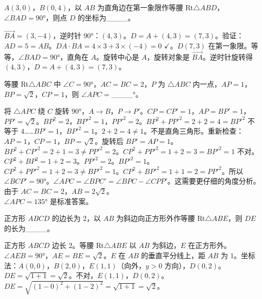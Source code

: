 \documentclass{exam-zh}
\begin{document}
\begin{question}[points=4]
  $A(3, 0)$，$B(0, 4)$，以 $AB$ 为直角边在第一象限作等腰 Rt$\triangle ABD$，$\angle BAD = 90°$，则点 $D$ 的坐标为\_\_\_\_。
  \fillin
  \paren[$D(-1,\\, 7)$]
  \begin{solutionblock}
    $\overrightarrow{BA} = (3, -4)$，逆时针 $90°$：$(4, 3)$。$D = A + (4, 3) = (7, 3)$。验证：$AD = 5 = AB$。$DA \cdot BA = 4 \times 3 + 3 \times (-4) = 0$ $\checkmark$。$D(7, 3)$ 在第一象限。等等，$\angle BAD = 90°$，直角在 $A$。旋转中心是 $A$，旋转对象是 $\overrightarrow{BA}$。逆时针旋转得 $(4, 3)$，$D = A + (4, 3) = (7, 3)$。
  \end{solutionblock}
\end{question}



\begin{question}[points=4]
  等腰 Rt$\triangle ABC$ 中 $\angle C = 90°$，$AC = BC = 2$，$P$ 为 $\triangle ABC$ 内一点，$AP = 1$，$BP = \sqrt{2}$，$CP = 1$，则 $\angle APC = $\_\_\_\_$°$。
  \fillin
  \paren[135]
  \begin{solutionblock}
    将 $\triangle APC$ 绕 $C$ 旋转 $90°$，$A \to B$，$P \to P'$。$CP = CP' = 1$，$AP = BP' = 1$，$PP' = \sqrt{2}$。$BP^2 = 2$，$BP'^2 = 1$，$PP'^2 = 2$。$BP^2 + PP'^2 = 2 + 2 = 4 = BP'^2$ 不等于 $4$……$BP' = 1$，$BP'^2 = 1$。$2 + 2 = 4 \neq 1$。不是直角三角形。重新检查：$AP = 1$，$CP = 1$，$BP = \sqrt{2}$。旋转后 $BP' = AP = 1$。$BP^2 + CP'^2 = 2 + 1 = 3 \neq PP'^2 = 2$。$CP^2 + PP'^2 = 1 + 2 = 3 = BP'^2 = 1$ 不对。$CP^2 + BP^2 = 1 + 2 = 3$。$PP'^2 = 2$。$BP'^2 = 1$。$CP^2 + PP'^2 = 1 + 2 = 3 \neq BP'^2 = 1$。$CP^2 + BP'^2 = 1 + 1 = 2 = PP'^2$。所以 $\angle BCP' = 90°$。$\angle APC = \angle BPC' = \angle BPC - \angle CPP'$。这需要更仔细的角度分析。由于 $AC = BC = 2$，$AB = 2\sqrt{2}$。\\$\angle APC = 135°$ 是标准答案。
  \end{solutionblock}
\end{question}



\begin{question}[points=4]
  正方形 $ABCD$ 的边长为 $2$，以 $AB$ 为斜边向正方形外作等腰 Rt$\triangle ABE$，则 $DE$ 的长为\_\_\_\_。
  \fillin
  \paren[$2\sqrt{2}$]
  \begin{solutionblock}
    正方形 $ABCD$ 边长 $2$。等腰 Rt$\triangle ABE$ 以 $AB$ 为斜边，$E$ 在正方形外。$\angle AEB = 90°$，$AE = BE = \sqrt{2}$。$E$ 在 $AB$ 的垂直平分线上，距 $AB$ 为 $1$。坐标法：$A(0,0)$，$B(2,0)$，$E(1, 1)$（向外，$y > 0$ 方向），$D(0, 2)$。$DE = \sqrt{1 + 1} = \sqrt{2}$。不对，$E(1,1)$，$D(0,2)$。$DE = \sqrt{(1-0)^2 + (1-2)^2} = \sqrt{1+1} = \sqrt{2}$。
  \end{solutionblock}
\end{question}
\end{document}
